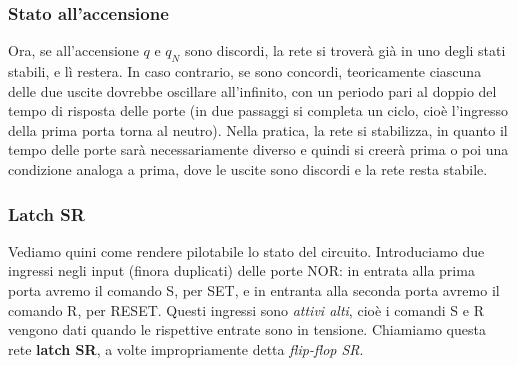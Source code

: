 \documentclass[a4paper,11pt]{article}
\begin{document}
\subsubsection{Stato all'accensione}
Ora, se all'accensione $q$ e $q_N$ sono discordi, la rete si troverà già in uno degli stati stabili, e lì restera.
In caso contrario, se sono concordi, teoricamente ciascuna delle due uscite dovrebbe oscillare all'infinito, con un periodo pari al doppio del tempo di risposta delle porte (in due passaggi si completa un ciclo, cioè l'ingresso della prima porta torna al neutro).
Nella pratica, la rete si stabilizza, in quanto il tempo delle porte sarà necessariamente diverso e quindi si creerà prima o poi una condizione analoga a prima, dove le uscite sono discordi e la rete resta stabile. 

\subsubsection{Latch SR}
Vediamo quini come rendere pilotabile lo stato del circuito.
Introduciamo due ingressi negli input (finora duplicati) delle porte NOR: in entrata alla prima porta avremo il comando S, per SET, e in entranta alla seconda porta avremo il comando R, per RESET.
Questi ingressi sono \textit{attivi alti}, cioè i comandi S e R vengono dati quando le rispettive entrate sono in tensione.
Chiamiamo questa rete \textbf{latch SR}, a volte impropriamente detta \textit{flip-flop SR}.
\end{document}
